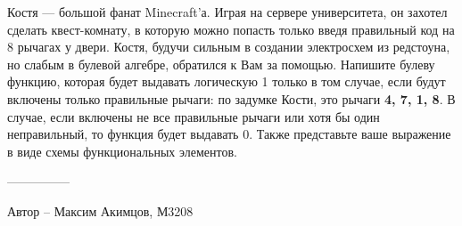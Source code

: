 \question
Костя — большой фанат Minecraft’а. Играя на сервере университета, он захотел сделать квест-комнату, в которую можно попасть только введя правильный код на 8 рычагах у двери. Костя, будучи сильным в создании электросхем из редстоуна, но слабым в булевой алгебре, обратился к Вам за помощью. Напишите булеву функцию, которая будет выдавать логическую 1 только в том случае, если будут включены только правильные рычаги: по задумке Кости, это рычаги \textbf{4, 7, 1, 8}. В случае, если включены не все правильные рычаги или хотя бы один неправильный, то функция будет выдавать 0. Также представьте ваше выражение в виде схемы функциональных элементов.

---------------

Автор -- Максим Акимцов, М3208